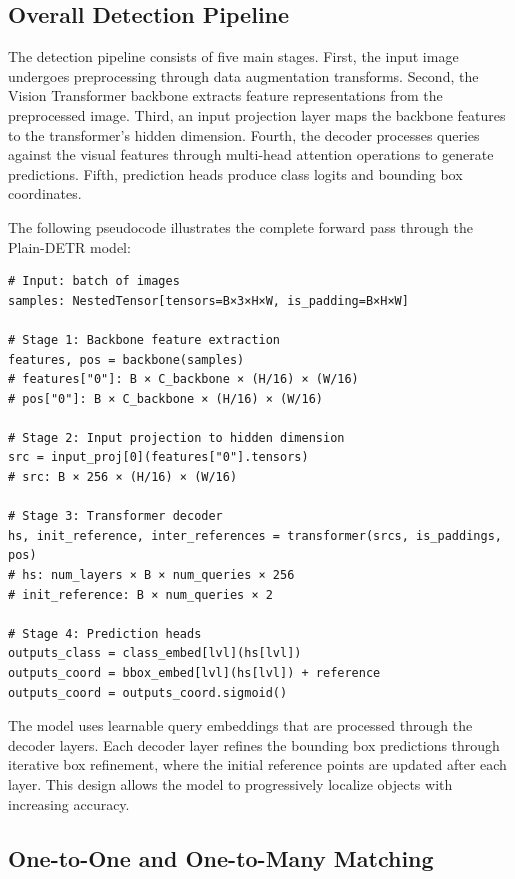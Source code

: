 \documentclass[12pt,a4paper]{article}
\begin{document}
\subsection{Overall Detection Pipeline}

The detection pipeline consists of five main stages. First, the input image undergoes preprocessing through data augmentation transforms. Second, the Vision Transformer backbone extracts feature representations from the preprocessed image. Third, an input projection layer maps the backbone features to the transformer's hidden dimension. Fourth, the decoder processes queries against the visual features through multi-head attention operations to generate predictions. Fifth, prediction heads produce class logits and bounding box coordinates.

The following pseudocode illustrates the complete forward pass through the Plain-DETR model:

\begin{verbatim}
# Input: batch of images
samples: NestedTensor[tensors=B×3×H×W, is_padding=B×H×W]

# Stage 1: Backbone feature extraction
features, pos = backbone(samples)
# features["0"]: B × C_backbone × (H/16) × (W/16)
# pos["0"]: B × C_backbone × (H/16) × (W/16)

# Stage 2: Input projection to hidden dimension
src = input_proj[0](features["0"].tensors)
# src: B × 256 × (H/16) × (W/16)

# Stage 3: Transformer decoder
hs, init_reference, inter_references = transformer(srcs, is_paddings, pos)
# hs: num_layers × B × num_queries × 256
# init_reference: B × num_queries × 2

# Stage 4: Prediction heads
outputs_class = class_embed[lvl](hs[lvl])
outputs_coord = bbox_embed[lvl](hs[lvl]) + reference
outputs_coord = outputs_coord.sigmoid()
\end{verbatim}

The model uses learnable query embeddings that are processed through the decoder layers. Each decoder layer refines the bounding box predictions through iterative box refinement, where the initial reference points are updated after each layer. This design allows the model to progressively localize objects with increasing accuracy.

\subsection{One-to-One and One-to-Many Matching}
\end{document}
